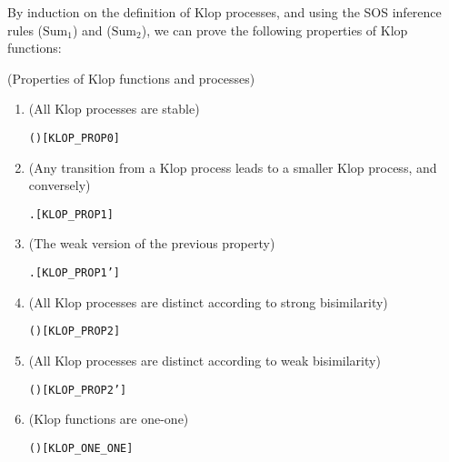 By induction on the definition of Klop processes,  and using the SOS inference
rules ($\mathrm{Sum}_1$) and ($\mathrm{Sum}_2$), we can  prove
the following properties of Klop functions:
\begin{proposition}{(Properties of Klop functions and processes)}
\begin{enumerate}
\item (All Klop processes are stable)
\begin{alltt}
\HOLTokenTurnstile{}  (  )\hfill[KLOP_PROP0]
\end{alltt}
\item (Any transition from a Klop process leads to a smaller Klop
  process, and conversely)
\begin{alltt}
\HOLTokenTurnstile{}    \HOLTokenTransBegin{} \HOLTokenTransEnd {} \HOLSymConst{\HOLTokenEquiv{}} \HOLSymConst{\HOLTokenExists{}}.  \HOLSymConst{\HOLTokenLt{}}  \HOLSymConst{\HOLTokenConj{}}  \HOLSymConst{=}   \hfill{[KLOP_PROP1]}
\end{alltt}
\item (The weak version of the previous property)
\begin{alltt}
\HOLTokenTurnstile{}    \HOLTokenWeakTransBegin{} \HOLTokenImp{}  \HOLSymConst{\HOLTokenEquiv{}} \HOLSymConst{\HOLTokenExists{}}.  \HOLSymConst{\HOLTokenLt{}}  \HOLSymConst{\HOLTokenConj{}}  \HOLSymConst{=}   \hfill{[KLOP_PROP1']}
\end{alltt}
\item (All Klop processes are distinct according to strong bisimilarity)
\begin{alltt}
\HOLTokenTurnstile{}  \HOLSymConst{\HOLTokenLt{}}  \HOLSymConst{\HOLTokenImp{}} \HOLSymConst{\HOLTokenNeg{}}(   \HOLSymConst{\HOLTokenStrongEQ}   )\hfill{[KLOP_PROP2]}
\end{alltt}
\item (All Klop processes are distinct according to weak bisimilarity)
\begin{alltt}
\HOLTokenTurnstile{}  \HOLSymConst{\HOLTokenLt{}}  \HOLSymConst{\HOLTokenImp{}} \HOLSymConst{\HOLTokenNeg{}}(   \HOLSymConst{\HOLTokenWeakEQ}   )\hfill{[KLOP_PROP2']}
\end{alltt}
\item (Klop functions are one-one)
\begin{alltt}
\HOLTokenTurnstile{}  ( )\hfill{[KLOP_ONE_ONE]}
\end{alltt}
\end{enumerate}
\end{proposition}
